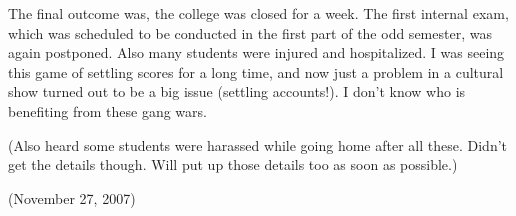 The final outcome was, the college was closed for a week. The first internal exam, which was scheduled to be conducted in the first part of the odd semester, was again postponed. Also many students were injured and hospitalized. I was seeing this game of settling scores for a long time, and now just a problem in a cultural show turned out to be a big issue (settling accounts!). I don’t know who is benefiting from these gang wars.

(Also heard some students were harassed while going home after all these. Didn’t get the details though. Will put up those details too as soon as possible.)

(November 27, 2007)
\newpage
